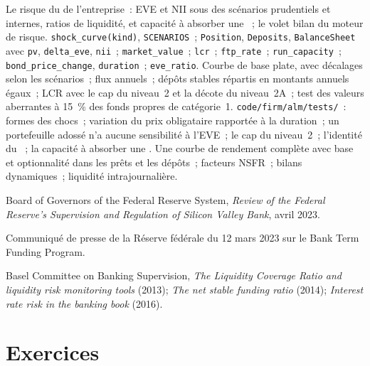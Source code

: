 \begin{build}
 Le risque du  de l'entreprise~: EVE et NII sous des scénarios prudentiels et internes,
ratios de liquidité,  et capacité à absorber une ~; le volet bilan du moteur de risque.
 \texttt{shock\_curve(kind)}, \texttt{SCENARIOS}~; \texttt{Position},
\texttt{Deposits}, \texttt{BalanceSheet} avec \texttt{pv}, \texttt{delta\_eve}, \texttt{nii}~;
\texttt{market\_value}~; \texttt{lcr}~; \texttt{ftp\_rate}~; \texttt{run\_capacity}~;
\texttt{bond\_price\_change}, \texttt{duration}~; \texttt{eve\_ratio}.
 Courbe de base plate, avec décalages selon les scénarios~; flux annuels~; dépôts stables répartis en
montants annuels égaux~; LCR avec le cap du niveau~2 et la décote du niveau~2A~; test des valeurs aberrantes à 15~\% des fonds propres de catégorie~1.
 \texttt{code/firm/alm/tests/}~: formes des chocs~; variation du prix obligataire rapportée
à la duration~; un portefeuille adossé n'a aucune sensibilité à l'EVE~; le cap du niveau~2~; l'identité du ~; la capacité à absorber une .
 Une courbe de rendement complète avec base et optionnalité dans les prêts et les dépôts~; facteurs NSFR~;
bilans dynamiques~; liquidité intrajournalière.
\end{build}

\begin{omsources}
\item Board of Governors of the Federal Reserve System, \emph{Review of the Federal Reserve's
Supervision and Regulation of Silicon Valley Bank}, avril 2023.
\item Communiqué de presse de la Réserve fédérale du 12 mars 2023 sur le Bank Term Funding Program.
\item Basel Committee on Banking Supervision, \emph{The Liquidity Coverage Ratio and liquidity risk
monitoring tools} (2013); \emph{The net stable funding ratio} (2014); \emph{Interest rate risk in the
banking book} (2016).
\end{omsources}

\section{Exercices}

